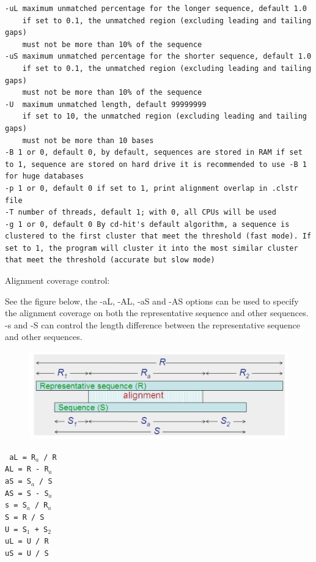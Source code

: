 \documentclass[12pt,a4paper]{article}
\begin{document}
\begin{lstlisting}
-uL maximum unmatched percentage for the longer sequence, default 1.0
    if set to 0.1, the unmatched region (excluding leading and tailing gaps)
    must not be more than 10% of the sequence
-uS maximum unmatched percentage for the shorter sequence, default 1.0
    if set to 0.1, the unmatched region (excluding leading and tailing gaps)
    must not be more than 10% of the sequence
-U  maximum unmatched length, default 99999999
    if set to 10, the unmatched region (excluding leading and tailing gaps)
    must not be more than 10 bases
-B 1 or 0, default 0, by default, sequences are stored in RAM if set to 1, sequence are stored on hard drive it is recommended to use -B 1 for huge databases
-p 1 or 0, default 0 if set to 1, print alignment overlap in .clstr file
-T number of threads, default 1; with 0, all CPUs will be used
-g 1 or 0, default 0 By cd-hit's default algorithm, a sequence is clustered to the first cluster that meet the threshold (fast mode). If set to 1, the program will cluster it into the most similar cluster that meet the threshold (accurate but slow mode)
\end{lstlisting}

Alignment coverage control:

See the figure below, the -aL, -AL, -aS and -AS options can be used to specify the alignment coverage on both the representative sequence and other sequences. -s and -S can control the length difference between the representative sequence and other sequences.

\begin{figure}[!h]
\includegraphics[width=\textwidth]{Figure2.png}

\end{figure}

\texttt{
aL = R$_a$ / R\\
AL = R - R$_a$\\
aS = S$_a$ / S\\
AS = S - S$_a$\\
s = S$_a$ / R$_a$\\
S = R / S\\
U = S$_1$ + S$_2$\\
uL = U / R\\
uS = U / S
}
\end{document}
